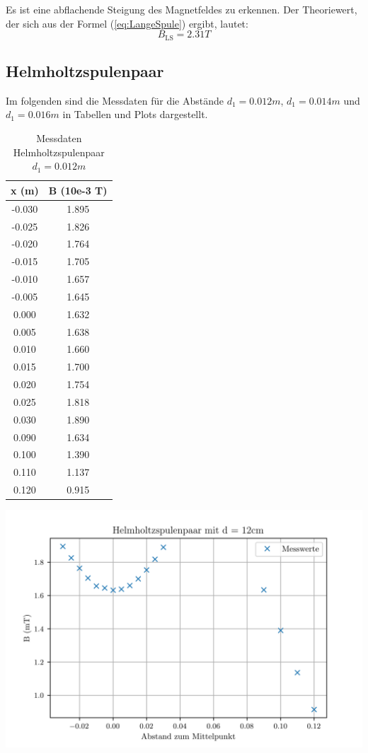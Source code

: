 Es ist eine abflachende Steigung des Magnetfeldes zu erkennen. Der Theoriewert, der sich aus der Formel (\ref{eq:LangeSpule}) ergibt, lautet:
\begin{equation}
  B_{\text{LS}} = 2.31 T
\end{equation}


\subsection{Helmholtzspulenpaar}

Im folgenden sind die Messdaten für die Abstände $d_{1} = 0.012m$, $d_{1} = 0.014m$ und $d_{1} = 0.016m$ in Tabellen und Plots dargestellt.

\begin{table}
\centering
\caption{Messdaten Helmholtzspulenpaar $d_{1} = 0.012m$}
\begin{tabular}{c c}
  \toprule
   x (m) &  B (10e-3 T) \\
  \midrule
  -0.030 &        1.895 \\
  -0.025 &        1.826 \\
  -0.020 &        1.764 \\
  -0.015 &        1.705 \\
  -0.010 &        1.657 \\
  -0.005 &        1.645 \\
   0.000 &        1.632 \\
   0.005 &        1.638 \\
   0.010 &        1.660 \\
   0.015 &        1.700 \\
   0.020 &        1.754 \\
   0.025 &        1.818 \\
   0.030 &        1.890 \\
   0.090 &        1.634 \\
   0.100 &        1.390 \\
   0.110 &        1.137 \\
   0.120 &        0.915 \\
  \bottomrule
\end{tabular}
\end{table}

\includegraphics[width=\textwidth]{pictures/Helmholtz1.png}    %

